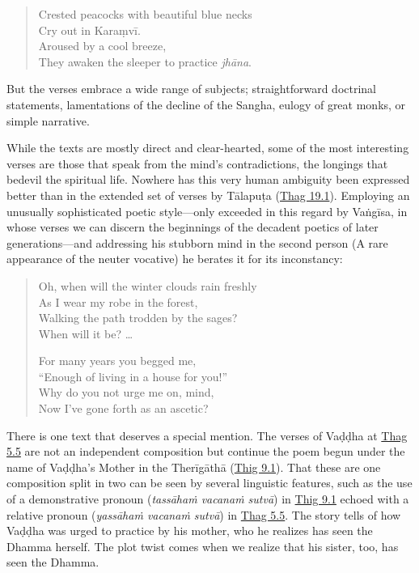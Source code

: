 \documentclass[12pt,openany]{book}%
\begin{document}
\begin{verse}%
Crested peacocks with beautiful blue necks \\
Cry out in \textsanskrit{Karaṃvī}. \\
Aroused by a cool breeze, \\
They awaken the sleeper to practice \textit{\textsanskrit{jhāna}}.

%
\end{verse}

But the verses embrace a wide range of subjects; straightforward doctrinal statements, lamentations of the decline of the Sangha, eulogy of great monks, or simple narrative.

While the texts are mostly direct and clear-hearted, some of the most interesting verses are those that speak from the mind’s contradictions, the longings that bedevil the spiritual life. Nowhere has this very human ambiguity been expressed better than in the extended set of verses by \textsanskrit{Tālapuṭa} (\href{https://suttacentral.net/thag19.1}{Thag 19.1}). Employing an unusually sophisticated poetic style—only exceeded in this regard by \textsanskrit{Vaṅgīsa}, in whose verses we can discern the beginnings of the decadent poetics of later generations—and addressing his stubborn mind in the second person (A rare appearance of the neuter vocative) he berates it for its inconstancy:

\begin{verse}%
Oh, when will the winter clouds rain freshly \\
As I wear my robe in the forest, \\
Walking the path trodden by the sages? \\
When will it be? …

For many years you begged me, \\
“Enough of living in a house for you!” \\
Why do you not urge me on, mind, \\
Now I’ve gone forth as an ascetic?

%
\end{verse}

There is one text that deserves a special mention. The verses of \textsanskrit{Vaḍḍha} at \href{https://suttacentral.net/thag5.5}{Thag 5.5} are not an independent composition but continue the poem begun under the name of \textsanskrit{Vaḍḍha}’s Mother in the \textsanskrit{Therīgāthā} (\href{https://suttacentral.net/thig9.1/en/sujato}{Thig 9.1}). That these are one composition split in two can be seen by several linguistic features, such as the use of a demonstrative pronoun (\textit{\textsanskrit{tassāhaṁ} \textsanskrit{vacanaṁ} \textsanskrit{sutvā}}) in \href{https://suttacentral.net/thig9.1/en/sujato}{Thig 9.1} echoed with a relative pronoun (\textit{\textsanskrit{yassāhaṁ} \textsanskrit{vacanaṁ} \textsanskrit{sutvā}}) in \href{https://suttacentral.net/thag5.5}{Thag 5.5}. The story tells of how \textsanskrit{Vaḍḍha} was urged to practice by his mother, who he realizes has seen the Dhamma herself. The plot twist comes when we realize that his sister, too, has seen the Dhamma.
\end{document}
